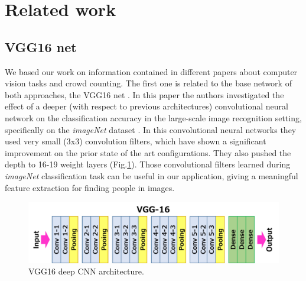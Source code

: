 \documentclass[10pt,twocolumn,letterpaper]{article}
\begin{document}
\section{Related work}

\subsection{VGG16 net}
We based our work on information contained in different papers about computer vision tasks and crowd counting. The first one is related to the base network of both approaches, the VGG16 net \cite{simonyan2014very}. In this paper the authors investigated the effect of a deeper (with respect to previous architectures) convolutional neural network on the classification accuracy in the
large-scale image recognition setting, specifically on the \textit{imageNet} dataset \cite{deng2009imagenet}. In this convolutional neural networks they used very small (3x3) convolution filters, which have shown a significant improvement on the prior state of the art configurations. They also pushed the depth to 16-19 weight layers (Fig.\ref{fig:vgg16}). Those convolutional filters learned during \textit{imageNet} classification task can be useful in our application, giving a meaningful feature extraction for finding people in images.

\begin{figure}[h!]
  \includegraphics[width=\linewidth]{pics/vgg16.png}
  \caption{VGG16 deep CNN architecture.}
  \label{fig:vgg16}
\end{figure}
\end{document}
